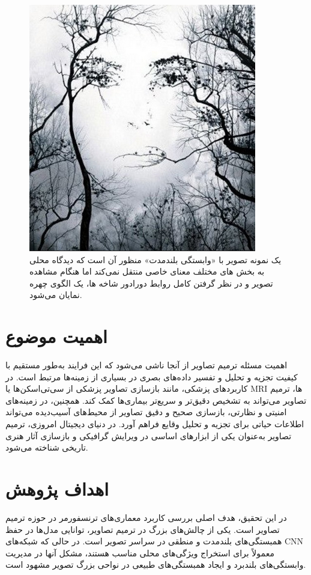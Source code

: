  \begin{figure}
 	\centering
 	\includegraphics[width=0.7\linewidth]{longterm}
 	\caption{یک نمونه تصویر با «وابستگی بلندمدت» منظور آن است که دیدگاه محلی به بخش های مختلف معنای خاصی منتقل نمی‌کند اما هنگام مشاهده تصویر و در نظر گرفتن کامل روابط دورادور شاخه ها، یک الگوی چهره نمایان می‌شود.}
 	\label{fig:longterm}
 \end{figure}
 

\section{اهمیت موضوع}
اهمیت مسئله ترمیم تصاویر از آنجا ناشی می‌شود که این فرایند به‌طور مستقیم با کیفیت تجزیه و تحلیل و تفسیر داده‌های بصری در بسیاری از زمینه‌ها مرتبط است. در کاربردهای پزشکی، مانند بازسازی تصاویر پزشکی از سی‌تی‌اسکن‌ها یا MRI‌ ها، ترمیم تصاویر می‌تواند به تشخیص دقیق‌تر و سریع‌تر بیماری‌ها کمک کند. همچنین، در زمینه‌های امنیتی و نظارتی، بازسازی صحیح و دقیق تصاویر از محیط‌های آسیب‌دیده می‌تواند اطلاعات حیاتی برای تجزیه و تحلیل وقایع فراهم آورد. در دنیای دیجیتال امروزی، ترمیم تصاویر به‌عنوان یکی از ابزارهای اساسی در ویرایش گرافیکی و بازسازی آثار هنری تاریخی شناخته می‌شود.


\section{اهداف پژوهش}

در این تحقیق، هدف اصلی بررسی کاربرد معماری‌های ترنسفورمر در حوزه ترمیم تصاویر است. یکی از چالش‌های بزرگ در ترمیم تصاویر، توانایی مدل‌ها در حفظ همبستگی‌های بلندمدت و منطقی در سراسر تصویر است. در حالی که شبکه‌های CNN معمولاً برای استخراج ویژگی‌های محلی مناسب هستند، مشکل آنها در مدیریت وابستگی‌های بلندبرد و ایجاد همبستگی‌های طبیعی در نواحی بزرگ تصویر مشهود است.

